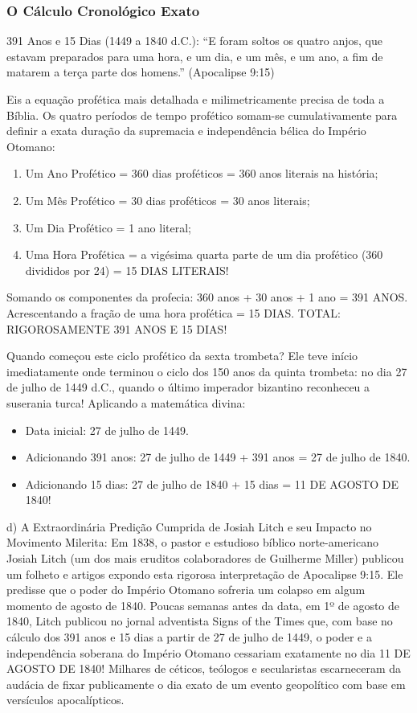 \subsubsection*{O Cálculo Cronológico Exato}
391 Anos e 15 Dias (1449 a 1840 d.C.):
``E foram soltos os quatro anjos, que estavam preparados para uma hora, e um dia, e um mês, e um ano, a fim de matarem a terça parte dos homens.'' (Apocalipse 9:15)

Eis a equação profética mais detalhada e milimetricamente precisa de toda a Bíblia. Os quatro períodos de tempo profético somam-se cumulativamente para definir a exata duração da supremacia e independência bélica do Império Otomano:
\begin{enumerate}
  \item Um Ano Profético = 360 dias proféticos = 360 anos literais na história;
  \item Um Mês Profético = 30 dias proféticos = 30 anos literais;
  \item Um Dia Profético = 1 ano literal;
  \item Uma Hora Profética = a vigésima quarta parte de um dia profético (360 divididos por 24) = 15 DIAS LITERAIS!
\end{enumerate}


Somando os componentes da profecia:
360 anos + 30 anos + 1 ano = 391 ANOS.
Acrescentando a fração de uma hora profética = 15 DIAS.
TOTAL: RIGOROSAMENTE 391 ANOS E 15 DIAS!

Quando começou este ciclo profético da sexta trombeta?
Ele teve início imediatamente onde terminou o ciclo dos 150 anos da quinta trombeta: no dia 27 de julho de 1449 d.C., quando o último imperador bizantino reconheceu a suserania turca!
Aplicando a matemática divina:
\begin{itemize}
  \item Data inicial: 27 de julho de 1449.
  \item Adicionando 391 anos: 27 de julho de 1449 + 391 anos = 27 de julho de 1840.
  \item Adicionando 15 dias: 27 de julho de 1840 + 15 dias = 11 DE AGOSTO DE 1840!
\end{itemize}


d) A Extraordinária Predição Cumprida de Josiah Litch e seu Impacto no Movimento Milerita:
Em 1838, o pastor e estudioso bíblico norte-americano Josiah Litch (um dos mais eruditos colaboradores de Guilherme Miller) publicou um folheto e artigos expondo esta rigorosa interpretação de Apocalipse 9:15. Ele predisse que o poder do Império Otomano sofreria um colapso em algum momento de agosto de 1840. Poucas semanas antes da data, em 1º de agosto de 1840, Litch publicou no jornal adventista Signs of the Times que, com base no cálculo dos 391 anos e 15 dias a partir de 27 de julho de 1449, o poder e a independência soberana do Império Otomano cessariam exatamente no dia 11 DE AGOSTO DE 1840! Milhares de céticos, teólogos e secularistas escarneceram da audácia de fixar publicamente o dia exato de um evento geopolítico com base em versículos apocalípticos.

